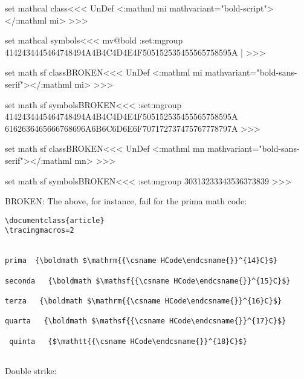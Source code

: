 \<set mathcal class\><<<
\ifx \mathboldcalMathClass\:UnDef
  \NewMathClass\mathboldcalMathClass
\fi
{}
    {<\a:mathml mi\Hnewline
         mathvariant="bold-script">}{</\a:mathml mi>}{}  
>>>

\<set mathcal symbols\><<<
\expandafter\ifx\csname mv@bold\endcsname\relax  \else
\bgroup
{}%
\find:set:mgroup{}{\mathboldcalMathClass}%
  {4142434445464748494A4B4C4D4E4F505152535455565758595A} |%
\egroup
\fi
>>>




\<set math sf classBROKEN\><<<
\ifx \boldmathsfMathClass\:UnDef
  \NewMathClass\boldmathsfMathClass
\fi
{}
    {<\a:mathml mi mathvariant="bold-sans-serif">}{</\a:mathml mi>}{}  
>>>

\<set math sf symbolsBROKEN\><<<
\find:set:mgroup{{\boldmath{}}}{\boldmathsfMathClass}%
  {4142434445464748494A4B4C4D4E4F505152535455565758595A%
   6162636465666768696A6B6C6D6E6F707172737475767778797A%
  }%
>>>

\<set math sf classBROKEN\><<<
\ifx \boldmathsfDigitMathClass\:UnDef
  \NewMathClass\boldmathsfDigitMathClass
\fi
{}
    {<\a:mathml mn mathvariant="bold-sans-serif">}{</\a:mathml mn>}{}  
>>>

\<set math sf symbolsBROKEN\><<<
\find:set:mgroup{{\boldmath{}}}{\boldmathsfDigitMathClass}%
  {30313233343536373839}%
>>>


BROKEN: The above, for instance, fail for the prima math code:

\begin{verbatim}
\documentclass{article} 
\tracingmacros=2 
 
  
prima  {\boldmath $\mathrm{{\csname HCode\endcsname{}}^{14}C}$} 
 
seconda   {\boldmath $\mathsf{{\csname HCode\endcsname{}}^{15}C}$} 
 
terza   {\boldmath $\mathrm{{\csname HCode\endcsname{}}^{16}C}$} 
 
quarta   {\boldmath $\mathsf{{\csname HCode\endcsname{}}^{17}C}$} 
 
 quinta   {$\mathtt{{\csname HCode\endcsname{}}^{18}C}$} 
 
\end{verbatim}






Double strike:


